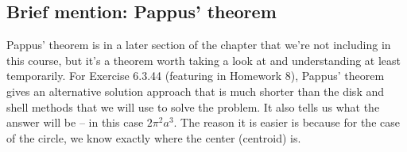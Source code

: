 \documentclass[10pt]{amsart}
\begin{document}
\subsection{Brief mention: Pappus' theorem}

Pappus' theorem is in a later section of the chapter that we're not
including in this course, but it's a theorem worth taking a look at
and understanding at least temporarily. For Exercise 6.3.44 (featuring
in Homework 8), Pappus' theorem gives an alternative solution approach
that is much shorter than the disk and shell methods that we will use
to solve the problem. It also tells us what the answer will be -- in
this case $2\pi^2a^3$. The reason it is easier is because for the case
of the circle, we know exactly where the center (centroid) is.
\end{document}
